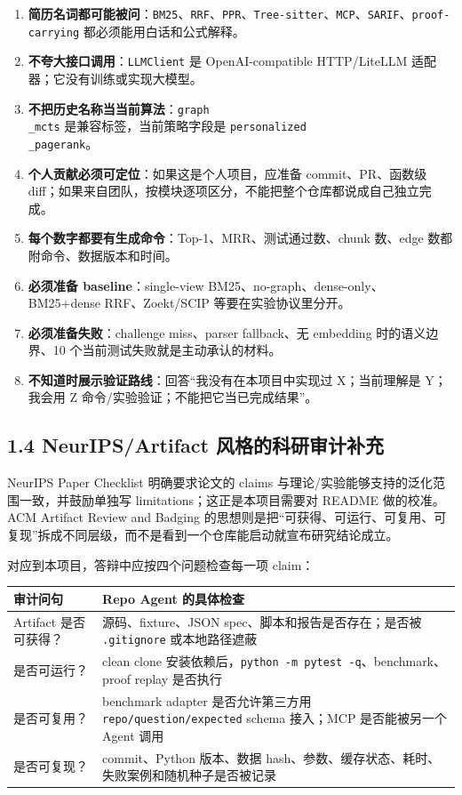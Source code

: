 \documentclass[UTF8,12pt,openany]{ctexbook}
\begin{document}
\begin{enumerate}
\item \textbf{简历名词都可能被问}：\texttt{BM25}、\texttt{RRF}、\texttt{PPR}、\texttt{Tree-sitter}、\texttt{MCP}、\texttt{SARIF}、\texttt{proof-carrying} 都必须能用白话和公式解释。
\item \textbf{不夸大接口调用}：\texttt{LLMClient} 是 OpenAI-compatible HTTP/LiteLLM 适配器；它没有训练或实现大模型。
\item \textbf{不把历史名称当当前算法}：\texttt{graph\\_mcts} 是兼容标签，当前策略字段是 \texttt{personalized\\_pagerank}。
\item \textbf{个人贡献必须可定位}：如果这是个人项目，应准备 commit、PR、函数级 diff；如果来自团队，按模块逐项区分，不能把整个仓库都说成自己独立完成。
\item \textbf{每个数字都要有生成命令}：Top-1、MRR、测试通过数、chunk 数、edge 数都附命令、数据版本和时间。
\item \textbf{必须准备 baseline}：single-view BM25、no-graph、dense-only、BM25+dense RRF、Zoekt/SCIP 等要在实验协议里分开。
\item \textbf{必须准备失败}：challenge miss、parser fallback、无 embedding 时的语义边界、10 个当前测试失败就是主动承认的材料。
\item \textbf{不知道时展示验证路线}：回答“我没有在本项目中实现过 X；当前理解是 Y；我会用 Z 命令/实验验证；不能把它当已完成结果”。
\end{enumerate}

\subsection{1.4 NeurIPS/Artifact 风格的科研审计补充}

NeurIPS Paper Checklist 明确要求论文的 claims 与理论/实验能够支持的泛化范围一致，并鼓励单独写 limitations；这正是本项目需要对 README 做的校准。ACM Artifact Review and Badging 的思想则是把“可获得、可运行、可复用、可复现”拆成不同层级，而不是看到一个仓库能启动就宣布研究结论成立。\par

对应到本项目，答辩中应按四个问题检查每一项 claim：\par

\begin{center}
\small
\begin{longtable}{|p{}|p{}|}
\toprule
审计问句 & Repo Agent 的具体检查 \\
\midrule
Artifact 是否可获得？ & 源码、fixture、JSON spec、脚本和报告是否存在；是否被 \texttt{.gitignore} 或本地路径遮蔽 \\
是否可运行？ & clean clone 安装依赖后，\texttt{python -m pytest -q}、benchmark、proof replay 是否执行 \\
是否可复用？ & benchmark adapter 是否允许第三方用 \texttt{repo/question/expected} schema 接入；MCP 是否能被另一个 Agent 调用 \\
是否可复现？ & commit、Python 版本、数据 hash、参数、缓存状态、耗时、失败案例和随机种子是否被记录 \\
\bottomrule
\end{longtable}
\end{center}
\end{document}
